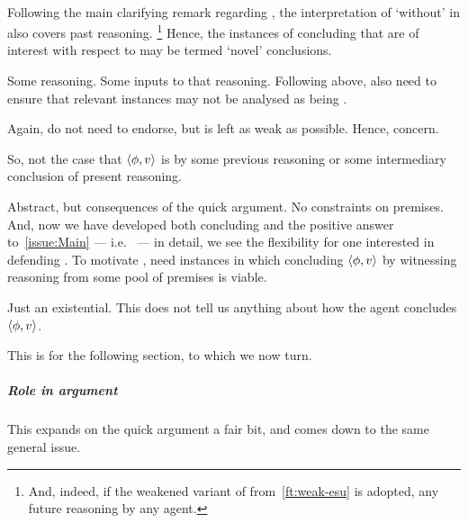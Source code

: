 \paragraph*{\EAS{}}

\begin{note}
  Following the main clarifying remark regarding \ESU{}, the interpretation of `without' in \EAS{} also covers past reasoning.%
  \footnote{
    And, indeed, if the weakened variant of \ESU{} from~\autoref{ft:weak-esu} is adopted, any future reasoning by any agent.
  }
  Hence, the instances of concluding that are of interest with respect to \EAS{} may be termed `novel' conclusions.
\end{note}

\begin{note}
  Some reasoning.
  Some inputs to that reasoning.
  Following above, also need to ensure that relevant instances may not be analysed as being \indicateVed{}.

  Again, do not need to endorse, but \ESU{} is left as weak as possible.
  Hence, concern.

  So, not the case that \(\langle \phi, v \rangle\) is \indicateVed{} by some previous reasoning or some intermediary conclusion of present reasoning.

  Abstract, but consequences of the quick argument.
  No constraints on premises.
  And, now we have developed both concluding and the positive answer to~\autoref{issue:Main} --- i.e.~\ESU{} --- in detail, we see the flexibility for one interested in defending \ESU{}.
  To motivate \EAS{}, need instances in which concluding \(\langle \phi, v \rangle\) by witnessing reasoning from some pool of premises is viable.
\end{note}

\begin{note}[Uninformative]
  Just an existential.
  This does not tell us anything about how the agent concludes \(\langle \phi, v \rangle\).

  This is for the following section, to which we now turn.
\end{note}


\subparagraph*{Role in argument}

\begin{note}
  \color{red}
  This expands on the quick argument a fair bit, and comes down to the same general issue.
\end{note}

